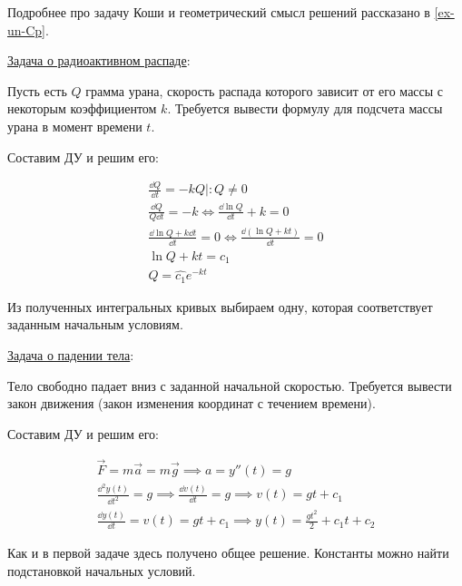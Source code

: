 \begin{remark}
  Подробнее про задачу Коши и геометрический смысл решений рассказано в
  \ref{ex-un-Cp}.
\end{remark}

\underline{Задача о радиоактивном распаде}: 

Пусть есть \(Q\) грамма урана, скорость распада которого зависит от его массы с
некоторым коэффициентом \(k\). Требуется вывести формулу для подсчета массы
урана в момент времени \(t\).

Составим ДУ и решим его:

\begin{align*}
  \frac{\dd Q}{\dd t} = -k Q \mid \colon Q \neq 0
  \\
  \frac{\dd Q}{Q \dd t} = -k
  \iff
  \frac{\dd \ln Q}{\dd t} + k = 0
  \\
  \frac{\dd \ln Q + k \dd t}{\dd t} = 0
  \iff
  \frac{\dd (\ln Q + k t)}{\dd t} = 0
  \\
  \ln Q + kt = c_{1} \\
  Q = \widehat{c_{1}} e^{-k t}
\end{align*}

Из полученных интегральных кривых выбираем одну, которая соответствует
заданным начальным условиям.

\underline{Задача о падении тела}: 

Тело свободно падает вниз с заданной начальной скоростью. Требуется вывести
закон движения (закон изменения координат с течением времени).

Составим ДУ и решим его:

\begin{align*}
  \vec{F} = m \vec{a} = m \vec{g} \implies a = y''(t) = g \\
  \frac{\dd^{2} y(t)}{\dd t^{2}} = g
  \implies \frac{\dd v(t)}{\dd t} = g 
  \implies v(t) = g t + c_{1} \\
  \frac{\dd y(t)}{\dd t}  = v(t) = g t + c_{1}
  \implies y(t) = \frac{g t^{2}}{2} + c_{1} t + c_{2}
\end{align*}

Как и в первой задаче здесь получено общее решение. Константы можно найти
подстановкой начальных условий.
